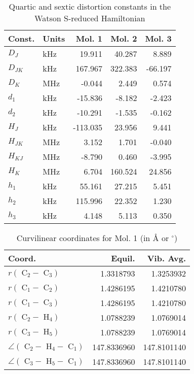 \begin{table}
\centering
\caption{Quartic and sextic distortion constants in the Watson S-reduced Hamiltonian}
\begin{tabular}{llrrr}
Const.        & Units    &     Mol. 1 &     Mol. 2 &     Mol. 3 \\
\hline
$D_{J}$       & kHz      &     19.911 &     40.287 &      8.889 \\
$D_{JK}$      & kHz      &    167.967 &    322.383 &    -66.197 \\
$D_{K}$       & MHz      &     -0.044 &      2.449 &      0.574 \\
$d_{1}$       & kHz      &    -15.836 &     -8.182 &     -2.423 \\
$d_{2}$       & kHz      &    -10.291 &     -1.535 &     -0.162 \\
\hline
$H_{J}$       & kHz      &   -113.035 &     23.956 &      9.441 \\
$H_{JK}$      & MHz      &      3.152 &      1.701 &     -0.040 \\
$H_{KJ}$      & MHz      &     -8.790 &      0.460 &     -3.995 \\
$H_{K}$       & MHz      &      6.704 &    160.524 &     24.856 \\
$h_{1}$       & kHz      &     55.161 &     27.215 &      5.451 \\
$h_{2}$       & kHz      &    115.996 &     22.352 &      1.230 \\
$h_{3}$       & kHz      &      4.148 &      5.113 &      0.350 \\
\end{tabular}
\end{table}

\begin{table}
\centering
\caption{Curvilinear coordinates for Mol. 1 (in \AA{} or $^\circ$)}
\begin{tabular}{lrr}
       Coord.         &             Equil. &          Vib. Avg. \\
\hline
$r(\text{ C}_{2 } - \text{ C}_{3 })$ &          1.3318793 &          1.3253932 \\
$r(\text{ C}_{1 } - \text{ C}_{2 })$ &          1.4286195 &          1.4210780 \\
$r(\text{ C}_{1 } - \text{ C}_{3 })$ &          1.4286195 &          1.4210780 \\
$r(\text{ C}_{2 } - \text{ H}_{4 })$ &          1.0788239 &          1.0769014 \\
$r(\text{ C}_{3 } - \text{ H}_{5 })$ &          1.0788239 &          1.0769014 \\
$\angle(\text{ C}_{2 } - \text{ H}_{4 } - \text{ C}_{1 })$ &        147.8336960 &        147.8101140 \\
$\angle(\text{ C}_{3 } - \text{ H}_{5 } - \text{ C}_{1 })$ &        147.8336960 &        147.8101140 \\
\end{tabular}
\end{table}

